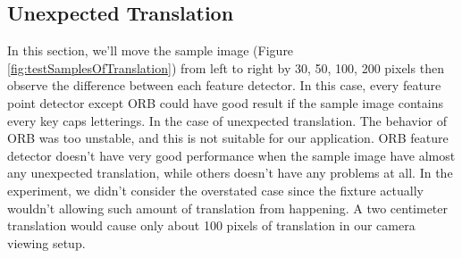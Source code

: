 	\subsection{Unexpected Translation}
		In this section, we'll move the sample image (Figure \ref{fig:testSamplesOfTranslation}) from left to right by 30, 50, 100, 200 pixels then observe the difference between each feature detector. 
		In this case, every feature point detector except ORB could have good result if the sample image contains every key caps letterings. In the case of unexpected translation. The behavior of ORB was too unstable, and this is not suitable for our application.
		ORB feature detector doesn't have very good performance when the sample image have almost any unexpected translation, while others doesn't have any problems at all.
		In the experiment, we didn't consider the overstated case since the fixture actually wouldn't allowing such amount of translation from happening. 
		A two centimeter translation would cause only about 100 pixels of translation in our camera viewing setup.
